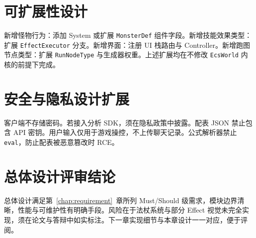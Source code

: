\section{可扩展性设计}

新增怪物行为：添加 System 或扩展 \texttt{MonsterDef} 组件字段。新增技能效果类型：扩展 \texttt{EffectExecutor} 分支。新增界面：注册 UI 栈路由与 Controller。新增跑图节点类型：扩展 \texttt{RunNodeType} 与生成器权重。上述扩展均在不修改 \texttt{EcsWorld} 内核的前提下完成\cite{gregory2018game}。

\section{安全与隐私设计扩展}

客户端不存储密码。若接入分析 SDK，须在隐私政策中披露。配表 JSON 禁止包含 API 密钥。用户输入仅用于游戏操控，不上传聊天记录。公式解析器禁止 \texttt{eval}，防止配表被恶意篡改时 RCE\cite{gregory2018game,petty2010vv}。

\section{总体设计评审结论}

总体设计满足第~\ref{chap:requirement}~章所列 Must/Should 级需求，模块边界清晰，性能与可维护性有明确手段。风险在于法杖系统与部分 Effect 视觉未完全实现，须在论文与答辩中如实标注。下一章实现细节与本章设计一一对应，便于评阅。
